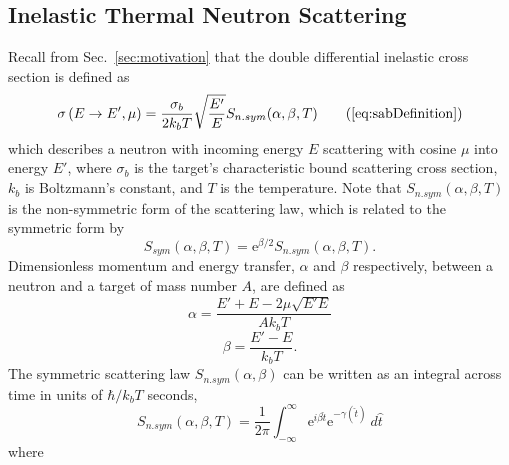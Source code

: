 \documentclass[../master.tex]{subfiles}
\begin{document}
		\subsection{Inelastic Thermal Neutron Scattering}
			Recall from Sec.~\ref{sec:motivation} that the double differential inelastic cross section is defined as 
			\begin{equation*}
				\sigma\left(E\rightarrow E',\mu\right)=\frac{\sigma_{b}}{2k_bT}\sqrt{\frac{E'}{E}}S_{n.sym}(\alpha,\beta,T)\tag{\ref{eq:sabDefinition}}
			\end{equation*}
			which describes a neutron with incoming energy $E$ scattering with cosine $\mu$ into energy $E'$, where $\sigma_b$ is the target's characteristic bound scattering cross section, $k_b$ is Boltzmann's constant, and $T$ is the temperature. Note that $S_{n.sym}(\alpha,\beta,T)$ is the non-symmetric form of the scattering law, which is related to the symmetric form by 
                        \begin{equation}
                          S_{sym}(\alpha,\beta,T)=\mathrm{e}^{\beta/2}S_{n.sym}(\alpha,\beta,T).
                        \end{equation}
                        Dimensionless momentum and energy transfer, $\alpha$ and $\beta$ respectively, between a neutron and a target of mass number $A$, are defined as 
			\begin{equation}
                          \alpha=\frac{E'+E-2\mu\sqrt{E'E}}{Ak_bT}\label{eq:alpha}
			\end{equation}
			\begin{equation}
                          \beta=\frac{E'-E}{k_bT}.\label{eq:beta}
			\end{equation}
			The symmetric scattering law $S_{n.sym}(\alpha,\beta)$ can be written as an integral across time in units of $\hbar/k_bT$ seconds, %
			\begin{equation}
				S_{n.sym}(\alpha,\beta,T)=\frac{1}{2\pi}\int_{-\infty}^{\infty}\mathrm{e}^{i\beta\hat{t}}\mathrm{e}^{-\gamma(\hat{t})}~d\hat{t}\label{eq:sabIntegralWithGamma}
			\end{equation}
			where 
\end{document}
